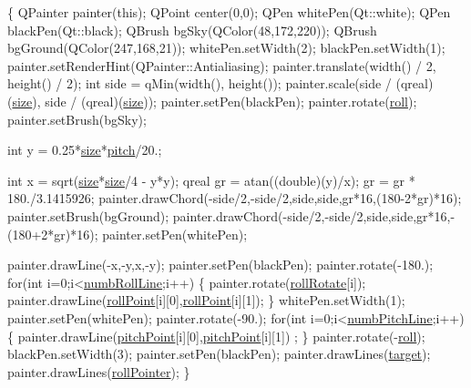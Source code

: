 \begin{DoxyCode}
\{
    QPainter painter(\textcolor{keyword}{this});
    QPoint center(0,0);
    QPen whitePen(Qt::white);
    QPen blackPen(Qt::black);
    QBrush bgSky(QColor(48,172,220));
    QBrush bgGround(QColor(247,168,21));
    whitePen.setWidth(2);
    blackPen.setWidth(1);
    painter.setRenderHint(QPainter::Antialiasing);
    painter.translate(width() / 2, height() / 2);
    \textcolor{keywordtype}{int} side = qMin(width(), height());
    painter.scale(side / (qreal)(\hyperlink{classqAttitudeIndicator_a0d7a73e4ee536cda1a005f626ef3935f}{size}), side / (qreal)(\hyperlink{classqAttitudeIndicator_a0d7a73e4ee536cda1a005f626ef3935f}{size}));
    painter.setPen(blackPen);
    painter.rotate(\hyperlink{classqAttitudeIndicator_a10c98e2fd9195050cb305f4b12bf75bb}{roll});
    painter.setBrush(bgSky);

    \textcolor{keywordtype}{int} y = 0.25*\hyperlink{classqAttitudeIndicator_a0d7a73e4ee536cda1a005f626ef3935f}{size}*\hyperlink{classqAttitudeIndicator_ae0df6492b15cc2d3f51c3de0e6dd08bd}{pitch}/20.;

    \textcolor{keywordtype}{int} x = sqrt(\hyperlink{classqAttitudeIndicator_a0d7a73e4ee536cda1a005f626ef3935f}{size}*\hyperlink{classqAttitudeIndicator_a0d7a73e4ee536cda1a005f626ef3935f}{size}/4 - y*y);
    qreal gr = atan((\textcolor{keywordtype}{double})(y)/x);
    gr = gr * 180./3.1415926;
    painter.drawChord(-side/2,-side/2,side,side,gr*16,(180-2*gr)*16);
    painter.setBrush(bgGround);
    painter.drawChord(-side/2,-side/2,side,side,gr*16,-(180+2*gr)*16);
    painter.setPen(whitePen);

    painter.drawLine(-x,-y,x,-y);
    painter.setPen(blackPen);
    painter.rotate(-180.);
    \textcolor{keywordflow}{for}(\textcolor{keywordtype}{int} i=0;i<\hyperlink{qattitudeindicator_8h_a533fb9cffe544953a1e34ef3ca40cd9aae68d533445c770721902ff44425e6cda}{numbRollLine};i++)
    \{
        painter.rotate(\hyperlink{classqAttitudeIndicator_afa3060f26300228565f05c0200d553c2}{rollRotate}[i]);
        painter.drawLine(\hyperlink{classqAttitudeIndicator_a739d71cc4dfba5d2fbb23186372c4fd4}{rollPoint}[i][0],\hyperlink{classqAttitudeIndicator_a739d71cc4dfba5d2fbb23186372c4fd4}{rollPoint}[i][1]);
    \}
    whitePen.setWidth(1);
    painter.setPen(whitePen);
    painter.rotate(-90.);
    \textcolor{keywordflow}{for}(\textcolor{keywordtype}{int} i=0;i<\hyperlink{qattitudeindicator_8h_a533fb9cffe544953a1e34ef3ca40cd9aaf86b1d616737ab90eedf9d904603bbc7}{numbPitchLine};i++)
    \{
        painter.drawLine(\hyperlink{classqAttitudeIndicator_a715b6a95898985f0f52ec6bf18010c9e}{pitchPoint}[i][0],\hyperlink{classqAttitudeIndicator_a715b6a95898985f0f52ec6bf18010c9e}{pitchPoint}[i][1])
      ;
    \}
    painter.rotate(-\hyperlink{classqAttitudeIndicator_a10c98e2fd9195050cb305f4b12bf75bb}{roll});
    blackPen.setWidth(3);
    painter.setPen(blackPen);
    painter.drawLines(\hyperlink{classqAttitudeIndicator_a7f5a24dd1bf00a9e81d2aeb0ac83359e}{target});
    painter.drawLines(\hyperlink{classqAttitudeIndicator_ac5ace954b2f7b2d88aeae586a1246c30}{rollPointer});
\}
\end{DoxyCode}
